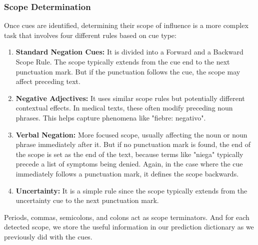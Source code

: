 \documentclass[9pt,a4paper,twoside]{tau-class/tau}
\begin{document}
        \subsubsection{Scope Determination}
            Once cues are identified, determining their scope of influence is a more complex task that involves four different rules based on cue type:        
        \begin{enumerate}
            \item \textbf{Standard Negation Cues:} It is divided into a Forward and a Backward Scope Rule. The scope typically extends from the cue end to the next punctuation mark. But if the punctuation follows the cue, the scope may affect preceding text.
            
            \item \textbf{Negative Adjectives:} It uses similar scope rules but potentially different contextual effects. In medical texts, these often modify preceding noun phrases. This helps capture phenomena like "fiebre: negativo".
            
            \item \textbf{Verbal Negation:} More focused scope, usually affecting the noun or noun phrase immediately after it. But if no punctuation mark is found, the end of the scope is set as the end of the text, because terms like "niega" typically precede a list of symptoms being denied. Again, in the case where the cue immediately follows a punctuation mark, it defines the scope backwards.
            
            \item \textbf{Uncertainty:} It is a simple rule since the scope typically extends from the uncertainty cue to the next punctuation mark.
        \end{enumerate}

        Periods, commas, semicolons, and colons act as scope terminators. And for each detected scope, we store the useful information in our prediction dictionary as we previously did with the cues. 
\end{document}
